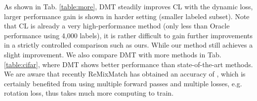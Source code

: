 \documentclass[preprint,review,10pt]{elsarticle}
\begin{document}
As shown in Tab. \ref{table:more}, DMT steadily improves CL with the dynamic loss, larger performance gain is shown in harder setting (smaller labeled subset). Note that CL is already a very high-performance method (only  less than Oracle performance using 4,000 labels), it is rather difficult to gain further improvements in a strictly controlled comparison such as ours. While our method still achieves a slight improvement. We also compare DMT with more methods in Tab. \ref{table:cifar}, where DMT shows better performance than state-of-the-art methods. We are aware that recently ReMixMatch \cite{berthelot2020remixmatch} has obtained an accuracy of , which is certainly benefited from using multiple forward passes and multiple losses, e.g. rotation loss, thus takes much more computing to train.



\begin{table}[t]
\caption{Results () between DMT and CL on CIFAR-10 \textit{test} set. }
\label{table:more}
\centering
{}
\end{table}

\begin{table}[t]
\caption{Results () for DMT and other methods on CIFAR-10 \textit{test} set using 4,000 labels. Oracle performance is . }
\label{table:cifar}
\centering
{}
\end{table}
\end{document}

